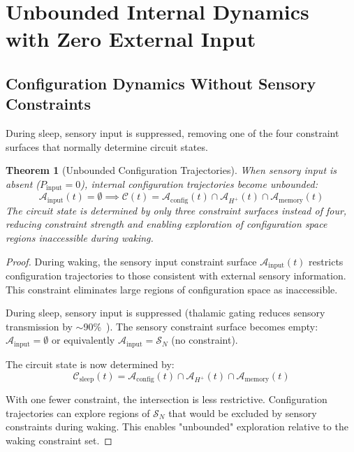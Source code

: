 \documentclass[aps,prd,twocolumn,superscriptaddress,floatfix,nofootinbib]{revtex4-2}
\newtheorem{theorem}{Theorem}[section]
\theoremstyle{remark}
\begin{document}
\section{Unbounded Internal Dynamics with Zero External Input}
\label{sec:dreams}

\subsection{Configuration Dynamics Without Sensory Constraints}

During sleep, sensory input is suppressed, removing one of the four constraint surfaces that normally determine circuit states.

\begin{theorem}[Unbounded Configuration Trajectories]
\label{thm:dreams}
When sensory input is absent ($P_{\text{input}} = 0$), internal configuration trajectories become unbounded:
\begin{equation}
\mathcal{A}_{\text{input}}(t) = \emptyset \implies \mathcal{C}(t) = \mathcal{A}_{\text{config}}(t) \cap \mathcal{A}_{H^+}(t) \cap \mathcal{A}_{\text{memory}}(t)
\end{equation}
The circuit state is determined by only three constraint surfaces instead of four, reducing constraint strength and enabling exploration of configuration space regions inaccessible during waking.
\end{theorem}

\begin{proof}
During waking, the sensory input constraint surface $\mathcal{A}_{\text{input}}(t)$ restricts configuration trajectories to those consistent with external sensory information. This constraint eliminates large regions of configuration space as inaccessible.

During sleep, sensory input is suppressed (thalamic gating reduces sensory transmission by $\sim$90\%~\cite{mccormick1992neurotransmitter}). The sensory constraint surface becomes empty: $\mathcal{A}_{\text{input}} = \emptyset$ or equivalently $\mathcal{A}_{\text{input}} = \mathcal{S}_N$ (no constraint).

The circuit state is now determined by:
$$
\mathcal{C}_{\text{sleep}}(t) = \mathcal{A}_{\text{config}}(t) \cap \mathcal{A}_{H^+}(t) \cap \mathcal{A}_{\text{memory}}(t)
$$

With one fewer constraint, the intersection is less restrictive. Configuration trajectories can explore regions of $\mathcal{S}_N$ that would be excluded by sensory constraints during waking. This enables "unbounded" exploration relative to the waking constraint set.
\end{proof}
\end{document}
